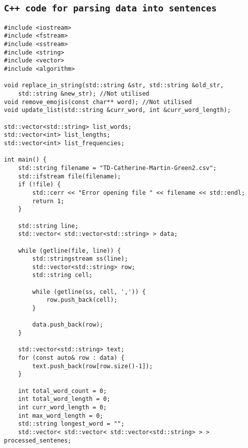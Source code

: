 \documentclass[a4paper,11pt]{article}
\begin{document}



\begin{appendices}
\section{\texttt{C++ code for parsing data into sentences}}
\begin{verbatim}
#include <iostream>
#include <fstream>
#include <sstream>
#include <string>
#include <vector>
#include <algorithm>

void replace_in_string(std::string &str, std::string &old_str, 
    std::string &new_str); //Not utilised
void remove_emojis(const char** word); //Not utilised
void update_list(std::string &curr_word, int &curr_word_length);

std::vector<std::string> list_words;
std::vector<int> list_lengths;
std::vector<int> list_frequencies;

int main() {
    std::string filename = "TD-Catherine-Martin-Green2.csv";
    std::ifstream file(filename);
    if (!file) {
        std::cerr << "Error opening file " << filename << std::endl;
        return 1;
    }

    std::string line;
    std::vector< std::vector<std::string> > data;

    while (getline(file, line)) {
        std::stringstream ss(line);
        std::vector<std::string> row;
        std::string cell;

        while (getline(ss, cell, ',')) {
            row.push_back(cell);
        }

        data.push_back(row);
    }

    std::vector<std::string> text;
    for (const auto& row : data) {
        text.push_back(row[row.size()-1]);
    }

    int total_word_count = 0;
    int total_word_length = 0;
    int curr_word_length = 0;
    int max_word_length = 0;
    std::string longest_word = "";
    std::vector< std::vector< std::vector<std::string> > > processed_sentenes;


\end{verbatim}
\end{appendices}
\end{document}
